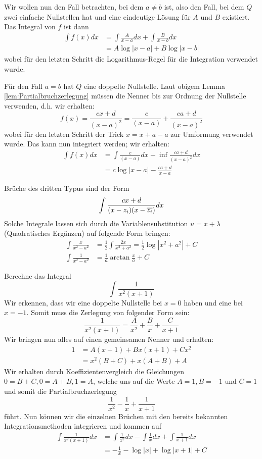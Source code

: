 Wir wollen nun den Fall betrachten, bei dem $a \ne b$ ist, also den Fall, bei dem $Q$ zwei einfache Nullstellen hat und eine eindeutige Lösung für $A$ und $B$ existiert. Das Integral von $f$ ist dann
\begin{align*}
    \int f(x) dx &= \int \frac{A}{x-a} dx + \int \frac{B}{x-b} dx \\
    &= A \log|x-a| + B \log |x-b|
\end{align*}
wobei für den letzten Schritt die Logarithmus-Regel für die Integration verwendet wurde.

Für den Fall $a=b$ hat $Q$ eine doppelte Nullstelle. Laut obigem Lemma \ref{lem:Partialbruchzerlegung} müssen die Nenner bis zur Ordnung der Nullstelle verwenden, d.h. wir erhalten:
$$f(x) = \frac{cx + d}{(x-a)^2} = \frac{c}{(x-a)} + \frac{ca + d}{(x-a)^2}$$
wobei für den letzten Schritt der Trick $x = x + a - a$ zur Umformung verwendet wurde. Das kann nun integriert werden; wir erhalten:
\begin{align*}
    \int f(x)dx &= \int\frac{c}{(x-a)}dx +\inf \frac{ca + d}{(x-a)^2}dx \\
    &= c\log|x-a|-\frac{ca+d}{x-a}
\end{align*}

Brüche des dritten Typus sind der Form
$$\int \frac{cx+d}{(x-z_i)(x-\overline{z_i})} dx$$
Solche Integrale lassen sich durch die Variablensubstitution $u = x + \lambda$ (Quadratisches Ergänzen) auf folgende Form bringen:
\begin{align*}
\int \frac{x}{x^2-a^2} &= \frac{1}{2} \int \frac{2x}{x^2+a^2} = \frac{1}{2} \log |x^2+a^2| + C\\
\int \frac{1}{x^2-a^2} &= \frac{1}{a} \arctan \frac{x}{a} + C
\end{align*}

\begin{example} Berechne das Integral 
$$\int \frac{1}{x^2(x+1)}$$
Wir erkennen, dass wir eine doppelte Nullstelle bei $x=0$ haben und eine bei $x=-1$. Somit muss die Zerlegung von folgender Form sein:
$$\frac{1}{x^2(x+1)} = \frac{A}{x^2}+\frac{B}{x}+\frac{C}{x+1}$$
Wir bringen nun alles auf einen gemeinsamen Nenner und erhalten:
\begin{align*}
    1 &= A(x+1)+Bx(x+1)+Cx^2\\
    &= x^2(B + C) + x(A+B)+ A
\end{align*}
Wir erhalten durch Koeffizientenvergleich die Gleichungen $0=B+C, 0 = A+B, 1 = A$, welche uns auf die Werte $A=1, B=-1$ und $C=1$ und somit die Partialbruchzerlegung
$$\frac{1}{x^2}-\frac{1}{x}+\frac{1}{x+1}$$
führt. Nun können wir die einzelnen Brüchen mit den bereits bekannten Integrationsmethoden integrieren und kommen auf
\begin{align*}
    \int \frac{1}{x^2(x+1)}dx &= \int \frac{1}{x^2}dx- \int \frac{1}{x}dx+\int \frac{1}{x+1}dx
    \\&= -\frac{1}{x} - \log|x| + \log|x+1| + C
\end{align*}
\end{example}

